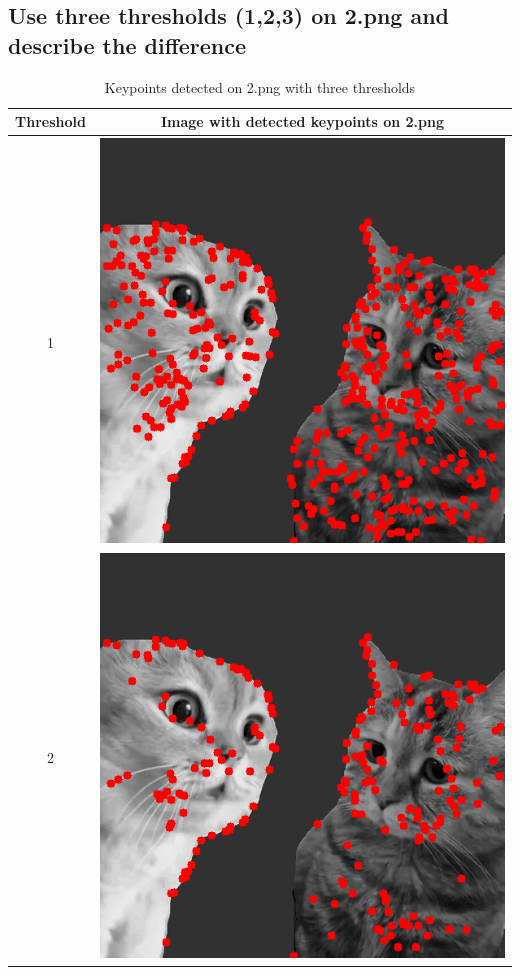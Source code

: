 \documentclass[a4paper, 12pt]{article}
\begin{document}
\subsection{Use three thresholds (1,2,3) on 2.png and describe the difference}
\begin{table}[!htb]
    \centering
    \caption{Keypoints detected on 2.png with three thresholds}
    \begin{tabular}{|c|c|}
        \hline
        Threshold & Image with detected keypoints on 2.png                         \\
        \hline
        1         & \includegraphics[scale=0.4]{part1/result/DoG_2_1.0_result.png} \\
        \hline
        2         & \includegraphics[scale=0.4]{part1/result/DoG_2_2.0_result.png} \\

\end{tabular}
\end{table}
\end{document}
